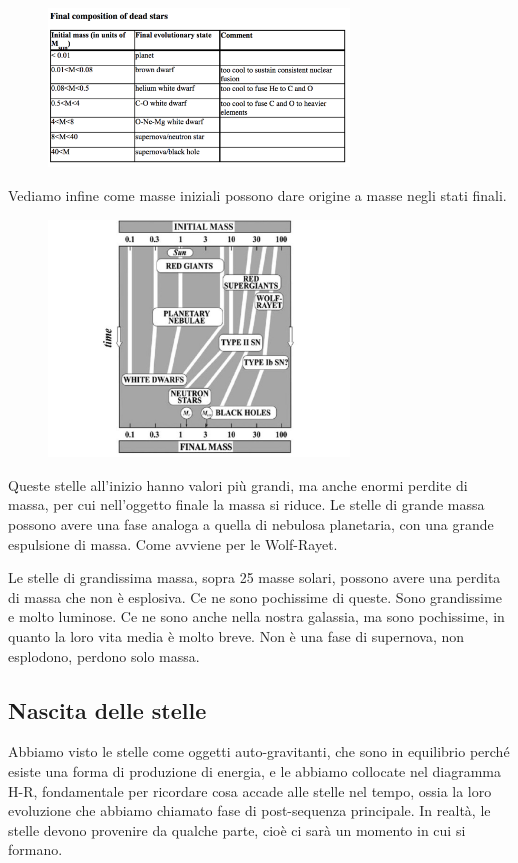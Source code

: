 \begin{figure}[H]
    \centering
    \includegraphics[width=8cm]{lezione 28 novembre/tabellamassefinali.png}
    \label{lezione 28 novembre/tabellamassefinali.png}
\end{figure}

Vediamo infine come masse iniziali possono dare origine a masse negli stati finali.

\begin{figure}[H]
    \centering
    \includegraphics[width=8cm]{lezione 28 novembre/evoluzionemasse.jpg}
    \label{lezione 28 novembre/evoluzionemasse.jpg}
\end{figure}

Queste stelle all'inizio hanno valori più grandi, ma anche enormi perdite di massa, per cui nell'oggetto finale la massa si riduce. Le stelle di grande massa possono avere una fase analoga a quella di nebulosa planetaria, con una grande espulsione di massa. Come avviene per le Wolf-Rayet.

Le stelle di grandissima massa, sopra 25 masse solari, possono avere una perdita di massa che non è esplosiva. Ce ne sono pochissime di queste. Sono grandissime e molto luminose. Ce ne sono anche nella nostra galassia, ma sono pochissime, in quanto la loro vita media è molto breve. Non è una fase di supernova, non esplodono, perdono solo massa.

\subsection{Nascita delle stelle}
Abbiamo visto le stelle come oggetti auto-gravitanti, che sono in equilibrio perché esiste una forma di produzione di energia, e le abbiamo collocate nel diagramma H-R, fondamentale per ricordare cosa accade alle stelle nel tempo, ossia la loro evoluzione che abbiamo chiamato fase di post-sequenza principale. In realtà, le stelle devono provenire da qualche parte, cioè ci sarà un momento in cui si formano.

